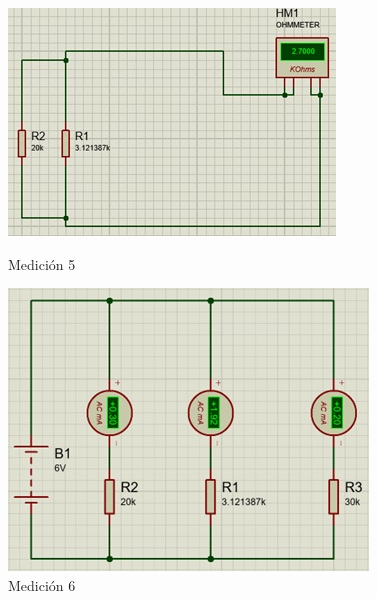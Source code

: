 	\begin{figure}[h]
		\begin{minipage}{0.5\textwidth}
			\centering
			\includegraphics[width=0.8\linewidth]{imagenes/12}
			\caption{Medición 5}
		\end{minipage}%
		\begin{minipage}{0.5\textwidth}
			\centering
			\includegraphics[width=0.8\linewidth]{imagenes/13}
			\caption{Medición 6}
		\end{minipage}
	\end{figure}

